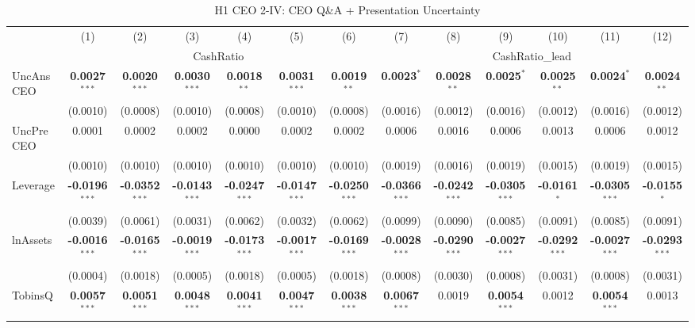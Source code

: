 \documentclass[11pt,a4paper]{article}
\begin{document}
\begin{table}[htbp]
\centering
\caption{H1 CEO 2-IV: CEO Q\&A + Presentation Uncertainty}
\label{tab:h1_ceo2}
\scriptsize
\begin{tabular}{lcccccccccccc}
\toprule
 & (1) & (2) & (3) & (4) & (5) & (6) & (7) & (8) & (9) & (10) & (11) & (12) \\
 & \multicolumn{6}{c}{CashRatio} & \multicolumn{6}{c}{CashRatio\_lead} \\
\cmidrule(lr){2-7} \cmidrule(lr){8-13}
\midrule
UncAnsCEO & \textbf{0.0027}$^{***}$ & \textbf{0.0020}$^{***}$ & \textbf{0.0030}$^{***}$ & \textbf{0.0018}$^{**}$ & \textbf{0.0031}$^{***}$ & \textbf{0.0019}$^{**}$ & \textbf{0.0023}$^{*}$ & \textbf{0.0028}$^{**}$ & \textbf{0.0025}$^{*}$ & \textbf{0.0025}$^{**}$ & \textbf{0.0024}$^{*}$ & \textbf{0.0024}$^{**}$ \\
 & (0.0010) & (0.0008) & (0.0010) & (0.0008) & (0.0010) & (0.0008) & (0.0016) & (0.0012) & (0.0016) & (0.0012) & (0.0016) & (0.0012) \\
UncPreCEO & 0.0001 & 0.0002 & 0.0002 & 0.0000 & 0.0002 & 0.0002 & 0.0006 & 0.0016 & 0.0006 & 0.0013 & 0.0006 & 0.0012 \\
 & (0.0010) & (0.0010) & (0.0010) & (0.0010) & (0.0010) & (0.0010) & (0.0019) & (0.0016) & (0.0019) & (0.0015) & (0.0019) & (0.0015) \\
\midrule
Leverage & \textbf{-0.0196}$^{***}$ & \textbf{-0.0352}$^{***}$ & \textbf{-0.0143}$^{***}$ & \textbf{-0.0247}$^{***}$ & \textbf{-0.0147}$^{***}$ & \textbf{-0.0250}$^{***}$ & \textbf{-0.0366}$^{***}$ & \textbf{-0.0242}$^{***}$ & \textbf{-0.0305}$^{***}$ & \textbf{-0.0161}$^{*}$ & \textbf{-0.0305}$^{***}$ & \textbf{-0.0155}$^{*}$ \\
 & (0.0039) & (0.0061) & (0.0031) & (0.0062) & (0.0032) & (0.0062) & (0.0099) & (0.0090) & (0.0085) & (0.0091) & (0.0085) & (0.0091) \\
lnAssets & \textbf{-0.0016}$^{***}$ & \textbf{-0.0165}$^{***}$ & \textbf{-0.0019}$^{***}$ & \textbf{-0.0173}$^{***}$ & \textbf{-0.0017}$^{***}$ & \textbf{-0.0169}$^{***}$ & \textbf{-0.0028}$^{***}$ & \textbf{-0.0290}$^{***}$ & \textbf{-0.0027}$^{***}$ & \textbf{-0.0292}$^{***}$ & \textbf{-0.0027}$^{***}$ & \textbf{-0.0293}$^{***}$ \\
 & (0.0004) & (0.0018) & (0.0005) & (0.0018) & (0.0005) & (0.0018) & (0.0008) & (0.0030) & (0.0008) & (0.0031) & (0.0008) & (0.0031) \\
TobinsQ & \textbf{0.0057}$^{***}$ & \textbf{0.0051}$^{***}$ & \textbf{0.0048}$^{***}$ & \textbf{0.0041}$^{***}$ & \textbf{0.0047}$^{***}$ & \textbf{0.0038}$^{***}$ & \textbf{0.0067}$^{***}$ & 0.0019 & \textbf{0.0054}$^{***}$ & 0.0012 & \textbf{0.0054}$^{***}$ & 0.0013 \\

\end{tabular}
\end{table}
\end{document}

